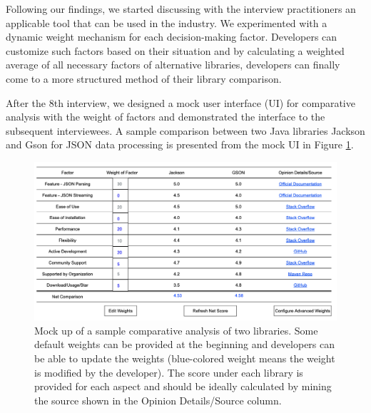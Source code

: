 Following our findings, we started discussing with the interview practitioners an applicable tool that can be used in the industry. We experimented with a dynamic weight mechanism for each decision-making factor. Developers can customize such factors based on their situation and by calculating a weighted average of all necessary factors of alternative libraries, developers can finally come to a more structured method of their library comparison. 

After the 8th interview, we designed a mock user interface (UI) for comparative analysis with the weight of factors and demonstrated the interface to the subsequent interviewees. A sample comparison between two Java libraries Jackson and Gson for JSON data processing is presented from the mock UI in Figure \ref{fig:ui-library-comparison}.
\begin{figure}
    \centering
    \includegraphics[scale=0.4]{images/mock-ui-library-comparison-2.png}
    \caption{Mock up of a sample comparative analysis of two libraries.
    Some default weights can be provided at the beginning and developers can be able to update the weights (blue-colored weight means the weight is modified by the developer). The score under each library is provided for each aspect and should be ideally calculated by mining the source shown in the Opinion Details/Source column.}
    \label{fig:ui-library-comparison}
\end{figure}

